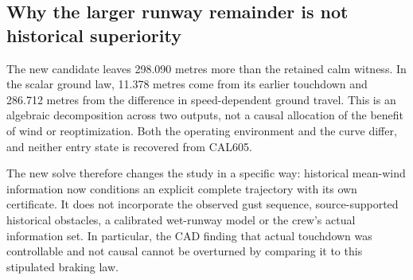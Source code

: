 \subsection{Why the larger runway remainder is not historical superiority}
The new candidate leaves 298.090 metres more than the retained calm witness. In the scalar ground law, 11.378 metres come from its earlier touchdown and 286.712 metres from the difference in speed-dependent ground travel. This is an algebraic decomposition across two outputs, not a causal allocation of the benefit of wind or reoptimization. Both the operating environment and the curve differ, and neither entry state is recovered from CAL605.

The new solve therefore changes the study in a specific way: historical mean-wind information now conditions an explicit complete trajectory with its own certificate. It does not incorporate the observed gust sequence, source-supported historical obstacles, a calibrated wet-runway model or the crew's actual information set. In particular, the CAD finding that actual touchdown was controllable and not causal cannot be overturned by comparing it to this stipulated braking law.

